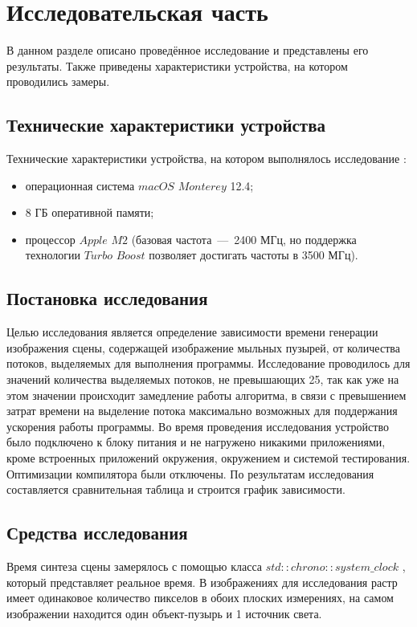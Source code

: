 \chapter{Исследовательская часть}

В данном разделе описано проведённое исследование и представлены его результаты. Также приведены характеристики устройства, на котором проводились замеры.

\section{Технические характеристики устройства}
Технические характеристики устройства, на котором выполнялось исследование \cite{web_item5}:
\begin{itemize}
	\item операционная система $macOS$ $Monterey$ 12.4;
	\item 8 ГБ оперативной памяти;
	\item процессор $Apple$ $M2$ (базовая частота~---~2400 МГц, но поддержка технологии $Turbo$ $Boost$ позволяет достигать частоты в 3500 МГц).
\end{itemize}

\section{Постановка исследования}
Целью исследования является определение зависимости времени генерации изображе­ния сцены, содержащей изображение мыльных пузырей, от количества потоков, выделяемых для выполнения программы. Исследование проводилось для значений количества выделяемых потоков, не превышающих 25, так как уже на этом значении происходит замедление работы алгоритма, в связи с превышением затрат времени на выделение потока максимально возможных для поддержания ускорения работы программы.
Во время проведения исследования устройство было подключено к блоку питания и не нагружено никакими приложениями, кроме встроенных приложений окружения, окружением и системой тестирования. Оптимизации компилятора были отключены.
По результатам исследования составляется сравнительная таблица и строится график зависимости.

\section{Средства исследования}
Время синтеза сцены замерялось с помощью класса $std::chrono::system\_clock$ \cite{web_item16}, который представляет реальное время. В изображениях для исследования растр имеет одинаковое количество пикселов в обоих плоских измерениях, на самом изображении находится один объект-пузырь и 1 источник света.

